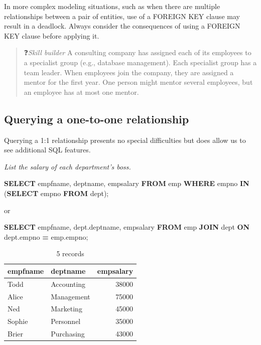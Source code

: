 \documentclass[
]{article}
\newenvironment{Shaded}{\begin{snugshade}}{\end{snugshade}}
\newcommand{\KeywordTok}[1]{\textcolor[rgb]{0.13,0.29,0.53}{\textbf{#1}}}
\newcommand{\NormalTok}[1]{#1}
\newcommand{\OperatorTok}[1]{\textcolor[rgb]{0.81,0.36,0.00}{\textbf{#1}}}
\begin{document}
In more complex modeling situations, such as when there are multiple
relationships between a pair of entities, use of a FOREIGN KEY clause
may result in a deadlock. Always consider the consequences of using a
FOREIGN KEY clause before applying it.

\begin{quote}
❓\emph{Skill builder} A consulting company has assigned each of its
employees to a specialist group (e.g., database management). Each
specialist group has a team leader. When employees join the company,
they are assigned a mentor for the first year. One person might mentor
several employees, but an employee has at most one mentor.
\end{quote}

\hypertarget{querying-a-one-to-one-relationship}{%
\subsection*{Querying a one-to-one relationship}\label{querying-a-one-to-one-relationship}}

Querying a 1:1 relationship presents no special difficulties but does
allow us to see additional SQL features.

\emph{List the salary of each department's boss.}

\begin{Shaded}
\begin{Highlighting}[]
\KeywordTok{SELECT}\NormalTok{ empfname, deptname, empsalary }\KeywordTok{FROM}\NormalTok{ emp}
    \KeywordTok{WHERE}\NormalTok{ empno }\KeywordTok{IN}\NormalTok{ (}\KeywordTok{SELECT}\NormalTok{ empno }\KeywordTok{FROM}\NormalTok{ dept);}
\end{Highlighting}
\end{Shaded}

or

\begin{Shaded}
\begin{Highlighting}[]
\KeywordTok{SELECT}\NormalTok{ empfname, dept.deptname, empsalary}
    \KeywordTok{FROM}\NormalTok{ emp }\KeywordTok{JOIN}\NormalTok{ dept}
        \KeywordTok{ON}\NormalTok{ dept.empno }\OperatorTok{=}\NormalTok{ emp.empno;}
\end{Highlighting}
\end{Shaded}

\begin{table}

\caption{\label{tab:unnamed-chunk-77}5 records}
\centering
\begin{tabular}[t]{l|l|r}
\hline
empfname & deptname & empsalary\\
\hline
Todd & Accounting & 38000\\
\hline
Alice & Management & 75000\\
\hline
Ned & Marketing & 45000\\
\hline
Sophie & Personnel & 35000\\
\hline
Brier & Purchasing & 43000\\
\hline
\end{tabular}
\end{table}
\end{document}
